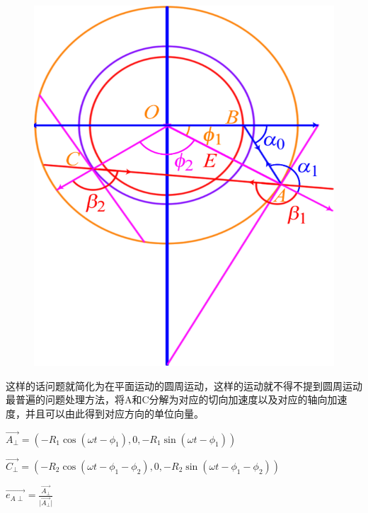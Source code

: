 \documentclass[12pt,a4paper]{ctexart}
\begin{document}
	\begin{figure}[h] %
	\centering %
	\includegraphics[scale=0.4]{T08.PNG} %
\end{figure}%
	
	\noindent\textbf{}
	
	这样的话问题就简化为在平面运动的圆周运动，这样的运动就不得不提到圆周运动最普遍的问题处理方法，将A和C分解为对应的切向加速度以及对应的轴向加速度，并且可以由此得到对应方向的单位向量。
	
	$\vec{A_{\perp}}=(-R_1\cos{(\omega t-\phi_1)},0,-R_1\sin{(\omega t-\phi_1)})$
	
	$\vec{C_{\perp}}=(-R_2\cos{(\omega t-\phi_1-\phi_2)},0,-R_2\sin{(\omega t-\phi_1-\phi_2)})$
	
	$\vec{e_{A\perp}}=\frac{\vec{A_{\perp}}}{\vert\vec{A_{\perp}}\vert}$
	
\end{document}
